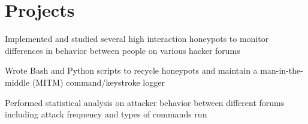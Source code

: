 \documentclass[]{deedy-resume-openfont}
\begin{document}
\begin{minipage}[t]{0.66\textwidth}
\section{Projects}
\begin{tightemize}
\item Implemented and studied several high interaction honeypots to monitor differences in behavior between people on various hacker forums
\item Wrote Bash and Python scripts to recycle honeypots and maintain a man-in-the-middle (MITM) command/keystroke logger
\item Performed statistical analysis on attacker behavior between different forums including attack frequency and types of commands run
\end{tightemize}
\sectionsep




\end{minipage}
\end{document}
